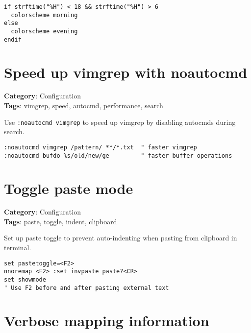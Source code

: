 {{{\begin{Exa*}{}
\begin{Verbatim}[fontsize=\footnotesize, breaklines, breakanywhere]
if strftime("%H") < 18 && strftime("%H") > 6
  colorscheme morning
else
  colorscheme evening
endif
\end{Verbatim}
\end{Exa*}

\section{Speed up vimgrep with noautocmd}

\textbf{Category}: Configuration\\ \textbf{Tags}: vimgrep, speed, autocmd, performance, search
\vspace{0.5cm}

Use {\footnotesize \Verb§:noautocmd vimgrep§} to speed up vimgrep by disabling autocmds during search.

\begin{Exa*}{}
\begin{Verbatim}[fontsize=\footnotesize, breaklines, breakanywhere]
:noautocmd vimgrep /pattern/ **/*.txt  " faster vimgrep
:noautocmd bufdo %s/old/new/ge         " faster buffer operations
\end{Verbatim}
\end{Exa*}

\section{Toggle paste mode}

\textbf{Category}: Configuration\\ \textbf{Tags}: paste, toggle, indent, clipboard
\vspace{0.5cm}

Set up paste toggle to prevent auto-indenting when pasting from clipboard in terminal.

\begin{Exa*}{}
\begin{Verbatim}[fontsize=\footnotesize, breaklines, breakanywhere]
set pastetoggle=<F2>
nnoremap <F2> :set invpaste paste?<CR>
set showmode
" Use F2 before and after pasting external text
\end{Verbatim}
\end{Exa*}

\section{Verbose mapping information}

}}}
